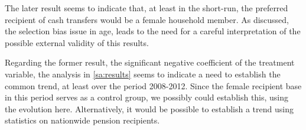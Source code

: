 \begin{refsection}
The later result seems to indicate that, at least in the short-run,
the preferred recipient of cash transfers would be a female household member.
As discussed, the selection bias issue in age,
leads to the need for a careful interpretation of the possible external validity of this results.

Regarding the former result, the significant negative coefficient of the treatment variable,
the analysis in \autoref{sa:results} seems to indicate a need to establish the common trend,
at least over the period 2008-2012.
Since the female recipient base in this period serves as a control group, we possibly could establish this, using the evolution here.
Alternatively, it would be possible to establish a trend using statistics on nationwide pension recipients.

\printbibliography
\end{refsection}
